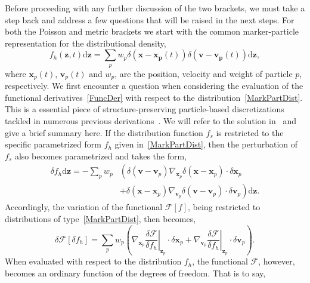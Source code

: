 \documentclass[preprint,12pt]{elsarticle}
\theoremstyle{definition}
\begin{document}
Before proceeding with any further discussion of the two brackets, we must take a step back and address a few questions that will be raised in the next steps. For both the Poisson and metric brackets we start with the common marker-particle representation for the distributional density,
\begin{equation}
    f_h (\boldsymbol{z}, t) \mathrm{d} \boldsymbol{z} = \sum_p w_p \delta (\boldsymbol{x} - \boldsymbol{\boldsymbol{x}_p} (t)) \delta (\boldsymbol{v} - \boldsymbol{\boldsymbol{v}_p} (t)) \mathrm{d} \boldsymbol{z},
    \label{MarkPartDist}
\end{equation}
where $\boldsymbol{x}_p(t)$, $\boldsymbol{v}_p(t)$ and $w_p$, are the position, velocity and weight of particle $p$, respectively. We first encounter a question when considering the evaluation of the functional derivatives~\eqref{FuncDer} with respect to the distribution~\eqref{MarkPartDist}. This is a essential piece of structure-preserving particle-based discretizations tackled in numerous previous derivations~\cite{Morrison1981,Kraus2017_GEMPIC,Carrillo2020}. We will refer to the solution in~\cite{Eero2020} and give a brief summary here. If the distribution function $f_s$ is restricted to the specific parametrized form $f_h$ given in~\eqref{MarkPartDist}, then the perturbation of $f_s$ also becomes parametrized and takes the form,
\begin{align}
\delta f_{h} \mathrm{d} \boldsymbol{z}=-\sum_{p} w_{p}&\left(\delta\left(\boldsymbol{v}-\boldsymbol{v}_{p}\right) \nabla_{\boldsymbol{x}_p} \delta\left(\boldsymbol{x}-\boldsymbol{x}_{p}\right) \cdot \delta \boldsymbol{x}_{p}\right.\\
&\left.+\delta\left(\boldsymbol{x}-\boldsymbol{x}_{p}\right) \nabla_{\boldsymbol{v}_p} \delta\left(\boldsymbol{v}-\boldsymbol{v}_{p}\right) \cdot \delta \boldsymbol{v}_{p}\right) \mathrm{d} \boldsymbol{z}.
\end{align}
Accordingly, the variation of the functional $\mathcal{F} \left[ f \right]$, being restricted to distributions of type~\eqref{MarkPartDist}, then becomes,
\begin{equation}
\delta \mathcal{F}\left[\delta f_{h}\right]=\sum_{p} w_{p}\left(\left.\nabla_{\boldsymbol{x}_p}\frac{\delta \mathcal{F}}{\delta f_h}\right|_{\boldsymbol{z}_{p}} \cdot \delta \boldsymbol{x}_{p}+\left.\nabla_{\boldsymbol{v}_p} \frac{\delta \mathcal{F}}{\delta f_h}\right|_{\boldsymbol{z}_{p}} \cdot \delta \boldsymbol{v}_{p}\right).
\end{equation} 
When evaluated with respect to the distribution $f_h$, the functional $\mathcal{F}$, however, becomes an ordinary function of the degrees of freedom. That is to say,
\end{document}
